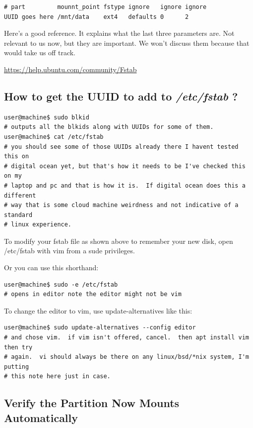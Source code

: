 \documentclass[10pt]{article}
\begin{document}
\begin{verbatim}
# part         mounnt_point fstype ignore   ignore ignore
UUID goes here /mnt/data    ext4   defaults 0      2
\end{verbatim}

Here's a good reference. It explains what the last three parameters are. Not
relevant to us now, but they are important. We won't discuss them because that
would take us off track.

\url{https://help.ubuntu.com/community/Fstab}

\subsection{How to get the UUID to add to \textit{/etc/fstab} ?}

\begin{lstlisting}
user@machine$ sudo blkid
# outputs all the blkids along with UUIDs for some of them.
user@machine$ cat /etc/fstab
# you should see some of those UUIDs already there I havent tested this on
# digital ocean yet, but that's how it needs to be I've checked this on my
# laptop and pc and that is how it is.  If digital ocean does this a different
# way that is some cloud machine weirdness and not indicative of a standard
# linux experience.
\end{lstlisting}

To modify your fstab file as shown above to remember your new disk, open
/etc/fstab with vim from a sude privileges. 

Or you can use this shorthand:

\begin{lstlisting}
user@machine$ sudo -e /etc/fstab
# opens in editor note the editor might not be vim
\end{lstlisting}

To change the editor to vim, use update-alternatives like this:

\begin{lstlisting}
user@machine$ sudo update-alternatives --config editor
# and chose vim.  if vim isn't offered, cancel.  then apt install vim then try
# again.  vi should always be there on any linux/bsd/*nix system, I'm putting
# this note here just in case.
\end{lstlisting}

\subsection{Verify the Partition Now Mounts Automatically}
\end{document}
